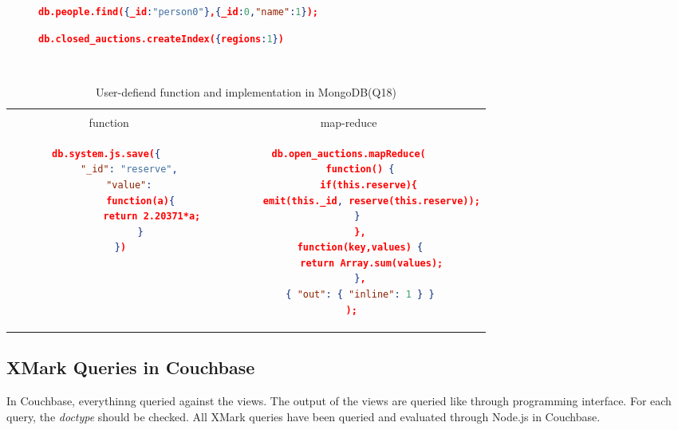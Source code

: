 \begin{figure}
\centering
\begin{lstlisting}[language=JSON, caption=XMark Query Q1 in MongoDB, label=mongo-xmark-q1]
		db.people.find({_id:"person0"},{_id:0,"name":1});
\end{lstlisting}

\centering
\begin{lstlisting}[language=JSON, caption=MongoDB secondary Index, label=mongodb-create-index]
             db.closed_auctions.createIndex({regions:1})
\end{lstlisting}

\begin{lstlisting}[language=JSON, caption=user-defined function in MongoDB, label=mongodb-user-defined-function]
         
\end{lstlisting}
\end{figure}



\begin{longtable}{c|c}
    \hline
	\caption{ User-defiend function and implementation in MongoDB(Q18)}
	\label{tbl:mongodb-q18}\\
    {function } & {map-reduce}\\
	\hline
\begin{minipage}{.4\textwidth}
\begin{lstlisting}[language=JSON,basicstyle =\scriptsize]
    db.system.js.save({ 
        "_id": "reserve", 
        "value": 
            function(a){ 
                return 2.20371*a; 
            } 
    })
\end{lstlisting}
\end{minipage} &
\begin{minipage}{.4\textwidth}
\begin{lstlisting}[language=JSON,basicstyle =\scriptsize]
db.open_auctions.mapReduce(
    function() {
       if(this.reserve){
        emit(this._id, reserve(this.reserve));
       }    
    },
    function(key,values) {
        return Array.sum(values);
    },
    { "out": { "inline": 1 } }
 );
\end{lstlisting}
\end{minipage}
\end{longtable}


\subsection{XMark Queries in Couchbase}
 In Couchbase, everythinng queried against the views. The output of the views are queried like through programming interface. For each query, the \textit{doctype} should be checked.  All XMark queries have been queried and evaluated through Node.js in Couchbase. 
 
